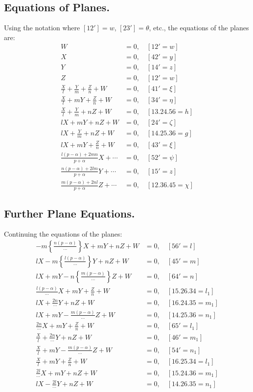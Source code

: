 \documentclass[11pt,a4paper]{article}
\begin{document}
\subsection*{Equations of Planes.}

Using the notation where $[12'] = w$, $[23'] = \theta$, etc., the equations of the planes are:
\begin{align*}
W &= 0, \quad [12' = w] \\
X &= 0, \quad [42' = y] \\
Y &= 0, \quad [14' = z] \\
Z &= 0, \quad [12' = w] \\
\frac{X}{l} + \frac{Y}{m} + \frac{Z}{n} + W &= 0, \quad [41' = \xi] \\
\frac{X}{l} + mY + \frac{Z}{n} + W &= 0, \quad [34' = \eta] \\
\frac{X}{l} + \frac{Y}{m} + nZ + W &= 0, \quad [13.24.56 = h] \\
lX + mY + nZ + W &= 0, \quad [24' = \zeta] \\
lX + \frac{Y}{m} + nZ + W &= 0, \quad [14.25.36 = g] \\
lX + mY + \frac{Z}{n} + W &= 0, \quad [43' = \xi] \\
\frac{l(p-\alpha) + 2mn}{p + \alpha} X + \cdots &= 0, \quad [52' = \psi] \\
\frac{n(p-\alpha) + 2lm}{p + \alpha} Y + \cdots &= 0, \quad [15' = z] \\
\frac{m(p-\alpha) + 2nl}{p + \alpha} Z + \cdots &= 0, \quad [12.36.45 = \chi]
\end{align*}

\subsection*{Further Plane Equations.}

Continuing the equations of the planes:
\begin{align*}
-m\left\{\frac{n(p-\alpha)}{\cdots}\right\}X + mY + nZ + W &= 0, \quad [56' = l] \\
lX - m\left\{\frac{l(p-\alpha)}{\cdots}\right\}Y + nZ + W &= 0, \quad [45' = m] \\
lX + mY - n\left\{\frac{m(p-\alpha)}{\cdots}\right\}Z + W &= 0, \quad [64' = n] \\
\frac{l(p-\alpha)}{\cdots}X + mY + \frac{Z}{n} + W &= 0, \quad [15.26.34 = l_1] \\
lX + \frac{2n}{\cdots}Y + nZ + W &= 0, \quad [16.24.35 = m_1] \\
lX + mY - \frac{m(p-\alpha)}{\cdots}Z + W &= 0, \quad [14.25.36 = n_1] \\
\frac{2n}{\cdots}X + mY + \frac{Z}{n} + W &= 0, \quad [65' = l_1] \\
\frac{X}{l} + \frac{2n}{\cdots}Y + nZ + W &= 0, \quad [46' = m_1] \\
\frac{X}{l} + mY - \frac{m(p-\alpha)}{\cdots}Z + W &= 0, \quad [54' = n_1] \\
\frac{X}{l} + mY + \frac{Z}{n} + W &= 0, \quad [16.25.34 = l_1] \\
\frac{2l}{\cdots}X + mY + nZ + W &= 0, \quad [15.24.36 = m_1] \\
lX - \frac{2l}{\cdots}Y + nZ + W &= 0, \quad [14.26.35 = n_1]
\end{align*}
\end{document}
